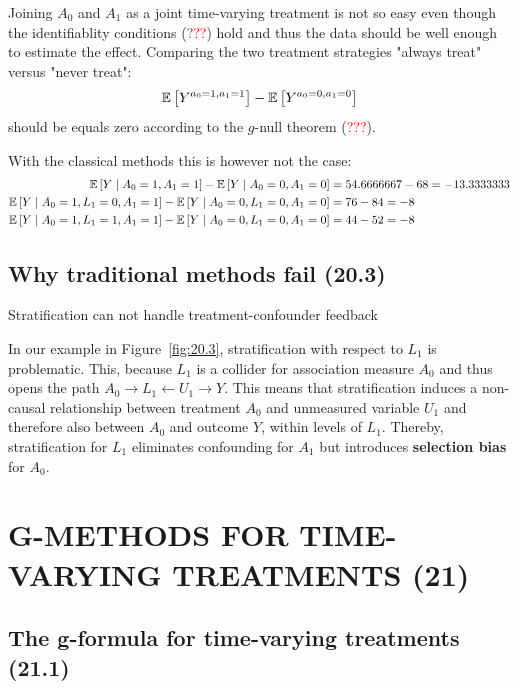 \documentclass[11pt,a4paper,twoside]{book}\usepackage[]{graphicx}\usepackage[]{xcolor}
\begin{document}
Joining $A_0$ and $A_1$ as a joint time-varying treatment is not so easy even though the identifiablity conditions (\textcolor{red}{???}) hold and thus the data should be well enough to estimate the effect.
Comparing the two treatment strategies "always treat" versus "never treat":
\begin{align*}
\operatorname{\mathbb{E}}\left[Y^{a_0=1,a_1=1}\right]-\operatorname{\mathbb{E}}\left[Y^{a_0=0,a_1=0}\right]
\end{align*}
should be equals zero according to the $g$-null theorem (\textcolor{red}{???}).



With the classical methods this is however not the case:
\begin{align*}
\operatorname{\mathbb{E}}\left[Y\mid A_0=1, A_1=1\right]-\operatorname{\mathbb{E}}\left[Y\mid A_0=0, A_1=0\right]&=54.6666667-68=-13.3333333\\
\operatorname{\mathbb{E}}\left[Y\mid A_0=1,L_1=0, A_1=1\right]-\operatorname{\mathbb{E}}\left[Y\mid A_0=0,L_1=0,A_1=0\right]&=76-84=-8\\
\operatorname{\mathbb{E}}\left[Y\mid A_0=1,L_1=1, A_1=1\right]-\operatorname{\mathbb{E}}\left[Y\mid A_0=0,L_1=0,A_1=0\right]&=44-52=-8
\end{align*}


\subsection{Why traditional methods fail (20.3)}

Stratification can not handle treatment-confounder feedback

In our example in Figure~\ref{fig:20.3}, stratification with respect to $L_1$ is problematic. This, because $L_1$ is a collider for association measure $A_0$ and thus opens the path $A_0\rightarrow L_1 \leftarrow U_1\rightarrow Y$.
This means that stratification induces a non-causal relationship between treatment $A_0$ and unmeasured variable $U_1$ and therefore also between $A_0$ and outcome $Y$, within levels of $L_1$.
Thereby, stratification for $L_1$ eliminates confounding for $A_1$ but introduces \textbf{selection bias} for $A_0$.


\section{G-METHODS FOR TIME-VARYING TREATMENTS (21)}


\subsection{The g-formula for time-varying treatments (21.1)}
\end{document}
